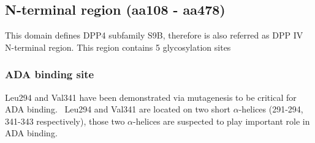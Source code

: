 \subsection{N-terminal region (aa108 - aa478)}

This domain defines DPP4 subfamily S9B, therefore is also referred as DPP IV N-terminal region. This region contains 5 glycosylation sites 

\subsubsection{ADA binding site}
Leu294 and Val341 have been demonstrated via mutagenesis to be critical for ADA binding.~\cite{Abbott_1999} Leu294 and Val341 are located on two short $\alpha$-helices (291-294, 341-343 respectively), those two $\alpha$-helices are suspected to play important role in ADA binding. 